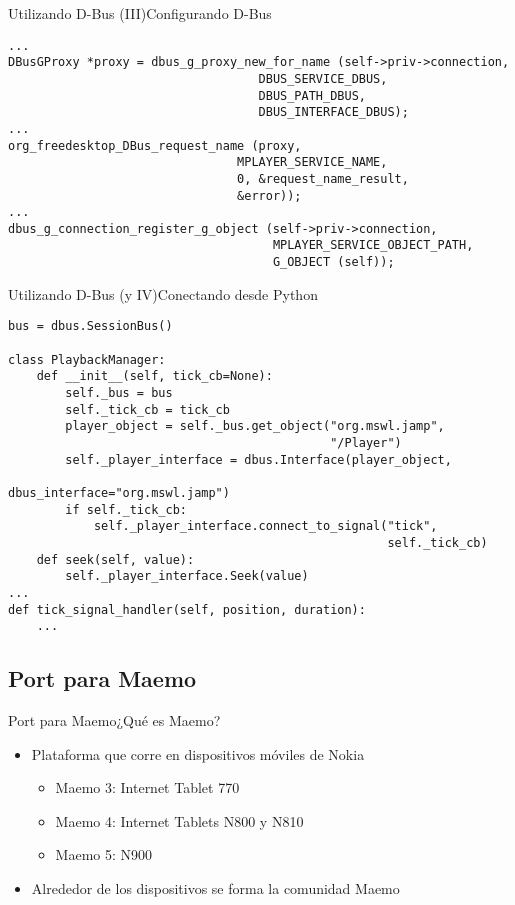 \documentclass{beamer}
\begin{document}
\begin{frame}[fragile]{Utilizando D-Bus (III)}{Configurando D-Bus}
\scriptsize{
\begin{verbatim}
...
DBusGProxy *proxy = dbus_g_proxy_new_for_name (self->priv->connection,
                                   DBUS_SERVICE_DBUS,
                                   DBUS_PATH_DBUS,
                                   DBUS_INTERFACE_DBUS);
...
org_freedesktop_DBus_request_name (proxy,
                                MPLAYER_SERVICE_NAME,
                                0, &request_name_result,
                                &error));
...
dbus_g_connection_register_g_object (self->priv->connection,
                                     MPLAYER_SERVICE_OBJECT_PATH,
                                     G_OBJECT (self));
\end{verbatim}}
\end{frame}

\begin{frame}[fragile]{Utilizando D-Bus (y IV)}{Conectando desde Python}
\tiny{
\begin{verbatim}
bus = dbus.SessionBus()

class PlaybackManager:
    def __init__(self, tick_cb=None):
        self._bus = bus
        self._tick_cb = tick_cb
        player_object = self._bus.get_object("org.mswl.jamp",
                                             "/Player")
        self._player_interface = dbus.Interface(player_object,
                                          dbus_interface="org.mswl.jamp")
        if self._tick_cb:
            self._player_interface.connect_to_signal("tick",
                                                     self._tick_cb)
    def seek(self, value):
        self._player_interface.Seek(value)
...
def tick_signal_handler(self, position, duration):
    ...
\end{verbatim}
}
\end{frame}

\subsection{Port para Maemo}

\begin{frame}[fragile]{Port para Maemo}{¿Qué es Maemo?}

\begin{center}
\hskip0.4cm
\end{center}

\begin{itemize}
  \item Plataforma que corre en dispositivos móviles de Nokia
  \begin{itemize}
    \item Maemo 3: Internet Tablet 770
    \item Maemo 4: Internet Tablets N800 y N810
    \item Maemo 5: N900
  \end{itemize}
  \item Alrededor de los dispositivos se forma la comunidad Maemo
\end{itemize}
\end{frame}
\end{document}
